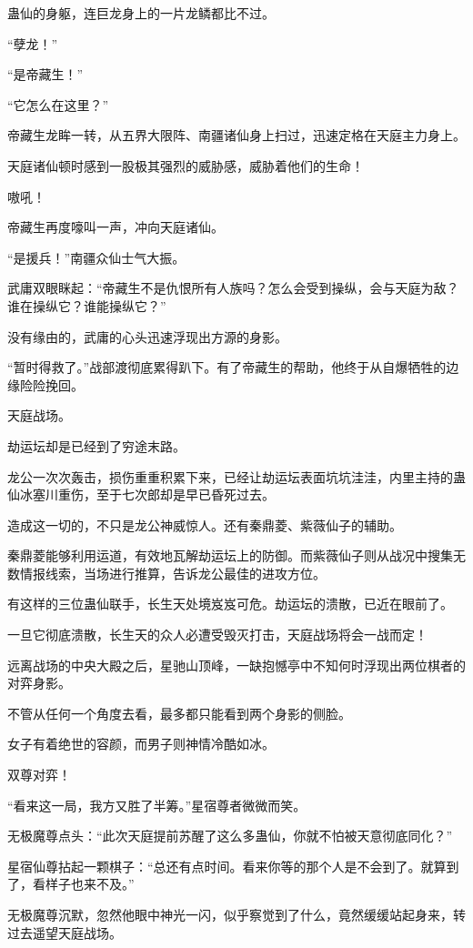\begin{this_body}
蛊仙的身躯，连巨龙身上的一片龙鳞都比不过。

“孽龙！”

“是帝藏生！”

“它怎么在这里？”

帝藏生龙眸一转，从五界大限阵、南疆诸仙身上扫过，迅速定格在天庭主力身上。

天庭诸仙顿时感到一股极其强烈的威胁感，威胁着他们的生命！

嗷吼！

帝藏生再度嚎叫一声，冲向天庭诸仙。

“是援兵！”南疆众仙士气大振。

武庸双眼眯起：“帝藏生不是仇恨所有人族吗？怎么会受到操纵，会与天庭为敌？谁在操纵它？谁能操纵它？”

没有缘由的，武庸的心头迅速浮现出方源的身影。

“暂时得救了。”战部渡彻底累得趴下。有了帝藏生的帮助，他终于从自爆牺牲的边缘险险挽回。

天庭战场。

劫运坛却是已经到了穷途末路。

龙公一次次轰击，损伤重重积累下来，已经让劫运坛表面坑坑洼洼，内里主持的蛊仙冰塞川重伤，至于七次郎却是早已昏死过去。

造成这一切的，不只是龙公神威惊人。还有秦鼎菱、紫薇仙子的辅助。

秦鼎菱能够利用运道，有效地瓦解劫运坛上的防御。而紫薇仙子则从战况中搜集无数情报线索，当场进行推算，告诉龙公最佳的进攻方位。

有这样的三位蛊仙联手，长生天处境岌岌可危。劫运坛的溃散，已近在眼前了。

一旦它彻底溃散，长生天的众人必遭受毁灭打击，天庭战场将会一战而定！

远离战场的中央大殿之后，星驰山顶峰，一缺抱憾亭中不知何时浮现出两位棋者的对弈身影。

不管从任何一个角度去看，最多都只能看到两个身影的侧脸。

女子有着绝世的容颜，而男子则神情冷酷如冰。

双尊对弈！

“看来这一局，我方又胜了半筹。”星宿尊者微微而笑。

无极魔尊点头：“此次天庭提前苏醒了这么多蛊仙，你就不怕被天意彻底同化？”

星宿仙尊拈起一颗棋子：“总还有点时间。看来你等的那个人是不会到了。就算到了，看样子也来不及。”

无极魔尊沉默，忽然他眼中神光一闪，似乎察觉到了什么，竟然缓缓站起身来，转过去遥望天庭战场。


\end{this_body}
